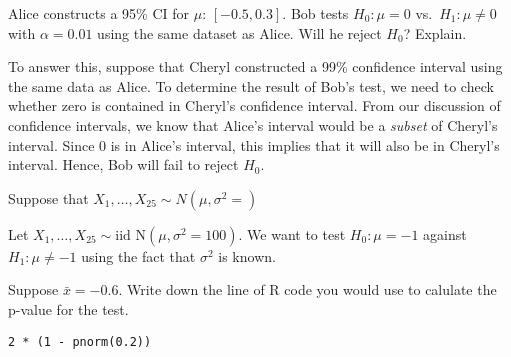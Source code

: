 \documentclass[addpoints,12pt]{exam}
\begin{document}
\begin{questions}
\question Alice constructs a 95\% CI for $\mu$: $[-0.5, 0.3]$. Bob tests $H_0\colon \mu = 0$ vs.\ $H_1\colon \mu\neq 0$ with $\alpha = 0.01$ using the same dataset as Alice. Will he reject $H_0$? Explain.
\begin{solution}
  To answer this, suppose that Cheryl constructed a 99\% confidence interval using the same data as Alice.
  To determine the result of Bob's test, we need to check whether zero is contained in Cheryl's confidence interval.
  From our discussion of confidence intervals, we know that Alice's interval would be a \emph{subset} of Cheryl's interval.
  Since $0$ is in Alice's interval, this implies that it will also be in Cheryl's interval. 
  Hence, Bob will fail to reject $H_0$.
\end{solution}

\question Suppose that $X_1, \dots, X_{25} \sim N(\mu, \sigma^2 = )$

\question Let $X_1, \dots, X_{25} \sim \mbox{iid N}(\mu, \sigma^2 = 100)$. We want to test $H_0\colon \mu = -1$ against $H_1\colon \mu \neq -1$ using the fact that $\sigma^2$ is known.

\question

  \question Suppose $\bar{x} = -0.6$. Write down the line of R code you would use to calulate the p-value for the test.
  \begin{solution}
    \texttt{2 * (1 - pnorm(0.2))}
  \end{solution}


\end{questions}
\end{document}
